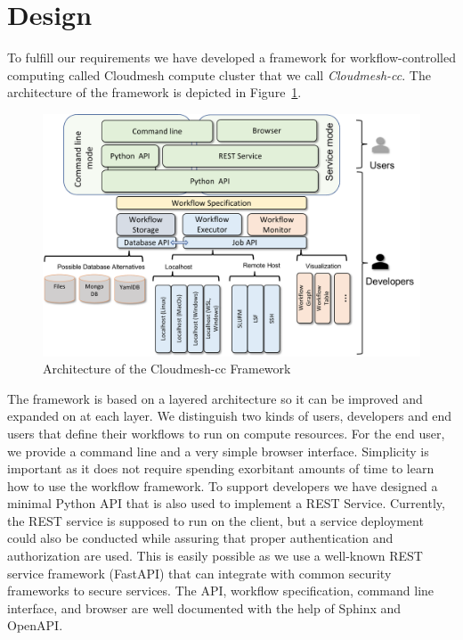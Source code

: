 
\section{Design}

To fulfill our requirements we have developed a framework for workflow-controlled computing called Cloudmesh compute cluster that we call
{\em Cloudmesh-cc}. The architecture of the framework is depicted in
Figure~\ref{fig:arch}.

\begin{figure}[htb]
\centering
\includegraphics[width=1.0\columnwidth]{images/cloudmesh-cc-arch.pdf}
\caption{Architecture of the Cloudmesh-cc Framework}\label{fig:arch}
\end{figure}

The framework is based on a layered architecture so it can be improved
and expanded on at each layer. We distinguish two kinds of users,
developers and end users that define their workflows to run on
compute resources. For the end user, we provide a command line and a
very simple browser interface. Simplicity is important as it does
not require spending exorbitant amounts of time to learn how to use
the workflow framework. To support developers we have designed a
minimal Python API that is also used to implement a REST Service.
Currently, the REST service is supposed to run on the client, but a
service deployment could also be conducted while assuring that proper
authentication and authorization are used. This is easily possible as
we use a well-known REST service framework (FastAPI) that can integrate
with common security frameworks to secure services. The API, workflow
specification, command line interface, and browser are well documented
with the help of Sphinx and OpenAPI.

